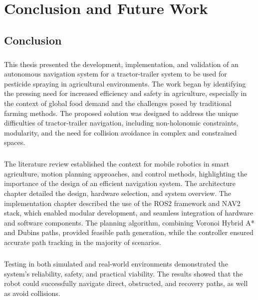 
\chapter{Conclusion and Future Work}
\label{cha:conclusion}

\section{Conclusion}
\paragraph{}This thesis presented the development, implementation, and validation of an autonomous navigation system for a tractor-trailer 
system to be used for pesticide spraying in agricultural environments. The work began by identifying the pressing need for 
increased efficiency and safety in agriculture, especially in the context of global food demand and the challenges 
posed by traditional farming methods. The proposed solution was designed to address the unique difficulties of 
tractor-trailer navigation, including non-holonomic constraints, modularity, and the need for collision 
avoidance in complex and constrained spaces.

\paragraph{}The literature review established the context for mobile robotics in smart agriculture, 
motion planning approaches, and control methods, highlighting the importance of the design of an efficient 
navigation system. The architecture chapter detailed the design, hardware selection, and system overview. The 
implementation chapter described the use of the \gls{ROS2} framework and \gls{NAV2} stack, which enabled modular 
development, and seamless integration of hardware and software components. The planning 
algorithm, combining Voronoi Hybrid A* and Dubins paths, provided feasible path generation, while the 
controller ensured accurate path tracking in the majority of scenarios.

\paragraph{}Testing in both simulated and real-world environments demonstrated the system's reliability, 
safety, and practical viability. The results showed that the robot could successfully navigate direct, obstructed, and 
recovery paths, as well as avoid collisions.

